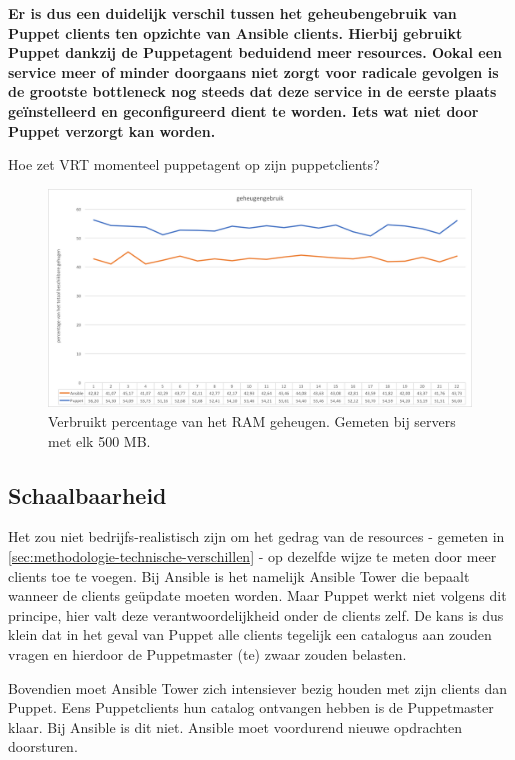 \textbf{Er is dus een duidelijk verschil tussen het geheubengebruik van Puppet clients ten opzichte van Ansible clients. Hierbij gebruikt Puppet dankzij de Puppetagent beduidend meer resources. Ookal een service meer of minder doorgaans niet zorgt voor radicale gevolgen is de grootste bottleneck nog steeds dat deze service in de eerste plaats ge\"instelleerd en geconfigureerd dient te worden. Iets wat niet door Puppet verzorgt kan worden.}

{\color{red} Hoe zet VRT  momenteel puppetagent op zijn puppetclients?}


\begin{figure}
  \includegraphics[width=\linewidth]{img/geheugengebruik}
 \caption{Verbruikt percentage van het RAM geheugen. Gemeten bij servers met elk 500 MB. }  
  \label{fig:geheugengebruik}
\end{figure}


\subsection{Schaalbaarheid}
\label{sec:schaalbaarheid}


Het zou niet bedrijfs-realistisch zijn om het gedrag van de resources  - gemeten in \ref{sec:methodologie-technische-verschillen} - op dezelfde wijze te meten door meer clients toe te voegen. Bij Ansible is het namelijk Ansible Tower die bepaalt wanneer de clients ge\"update moeten worden. Maar Puppet werkt niet volgens dit principe, hier valt deze verantwoordelijkheid onder de clients zelf. De kans is dus klein dat in het geval van Puppet alle clients tegelijk een catalogus aan zouden vragen en hierdoor de Puppetmaster (te) zwaar zouden belasten. 

Bovendien moet Ansible Tower zich intensiever bezig houden met zijn clients dan Puppet. Eens Puppetclients hun \gls{catalog} ontvangen hebben is de Puppetmaster klaar. Bij Ansible is dit niet. Ansible moet voordurend nieuwe opdrachten doorsturen.


